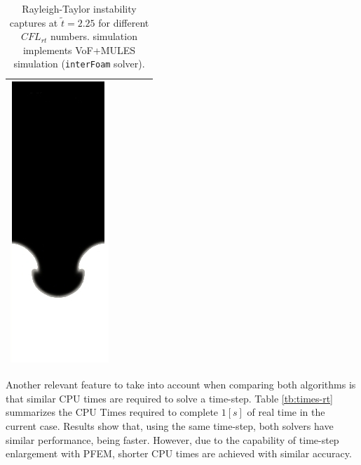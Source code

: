 \begin{table}[H]
\begin{center}
\begin{tabular}{m{} | >{\centering}m{} | >{\centering}m{} | >{\centering}m{} | m{} }
      \includegraphics[width=.17\columnwidth]{../images/rayleigh_foam_dts_D.jpg}
      \\
      \hline
\end{tabular}
\caption{\label{fg:rayleigh-comparison-dts} Rayleigh-Taylor instability captures at $\widetilde{t}=2.25$ for different $CFL_{rt}$ numbers. \OF simulation implements VoF+MULES simulation  (\texttt{interFoam} solver).}
\end{center}
\end{table}
% 
% 
% 
% 

Another relevant feature to take into account when comparing both algorithms is that similar CPU times are required to solve a time-step.
Table \ref{tb:times-rt} summarizes the CPU Times required to complete $1[s]$ of real time in the current case. Results show that, using the same time-step, both solvers have similar performance, being \OF faster. However, due to the capability of time-step enlargement with PFEM, shorter CPU times are achieved with similar accuracy.

